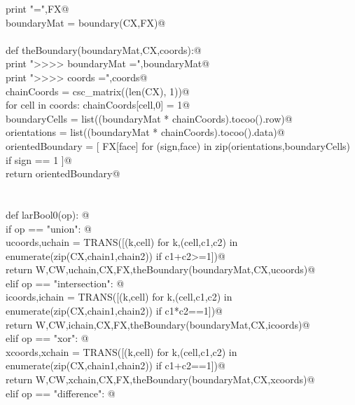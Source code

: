 \documentclass[11pt,oneside]{article}	%
\begin{document}
\begin{flushleft}
\begin{list}{}{}
\mbox{}\verb@   print "\nFX =",FX@\\
\mbox{}\verb@   boundaryMat = boundary(CX,FX)@\\
\mbox{}\verb@@\\
\mbox{}\verb@   def theBoundary(boundaryMat,CX,coords):@\\
\mbox{}\verb@      print "\n>>>> boundaryMat =",boundaryMat@\\
\mbox{}\verb@      print "\n>>>> coords =",coords@\\
\mbox{}\verb@      chainCoords = csc_matrix((len(CX), 1))@\\
\mbox{}\verb@      for cell in coords: chainCoords[cell,0] = 1@\\
\mbox{}\verb@      boundaryCells = list((boundaryMat * chainCoords).tocoo().row)@\\
\mbox{}\verb@      orientations = list((boundaryMat * chainCoords).tocoo().data)@\\
\mbox{}\verb@      orientedBoundary = [ FX[face] for (sign,face) in zip(orientations,boundaryCells)  if sign == 1 ]@\\
\mbox{}\verb@      return orientedBoundary@\\
\mbox{}\verb@@\\
\mbox{}\verb@@\\
\mbox{}\verb@   def larBool0(op): @\\
\mbox{}\verb@      if op == "union": @\\
\mbox{}\verb@         ucoords,uchain = TRANS([(k,cell) for k,(cell,c1,c2) in enumerate(zip(CX,chain1,chain2)) if c1+c2>=1])@\\
\mbox{}\verb@         return W,CW,uchain,CX,FX,theBoundary(boundaryMat,CX,ucoords)@\\
\mbox{}\verb@      elif op == "intersection": @\\
\mbox{}\verb@         icoords,ichain = TRANS([(k,cell) for k,(cell,c1,c2) in enumerate(zip(CX,chain1,chain2)) if c1*c2==1])@\\
\mbox{}\verb@         return W,CW,ichain,CX,FX,theBoundary(boundaryMat,CX,icoords)@\\
\mbox{}\verb@      elif op == "xor": @\\
\mbox{}\verb@         xcoords,xchain = TRANS([(k,cell) for k,(cell,c1,c2) in enumerate(zip(CX,chain1,chain2)) if c1+c2==1])@\\
\mbox{}\verb@         return W,CW,xchain,CX,FX,theBoundary(boundaryMat,CX,xcoords)@\\
\mbox{}\verb@      elif op == "difference": @\\

\end{list}
\end{flushleft}
\end{document}
